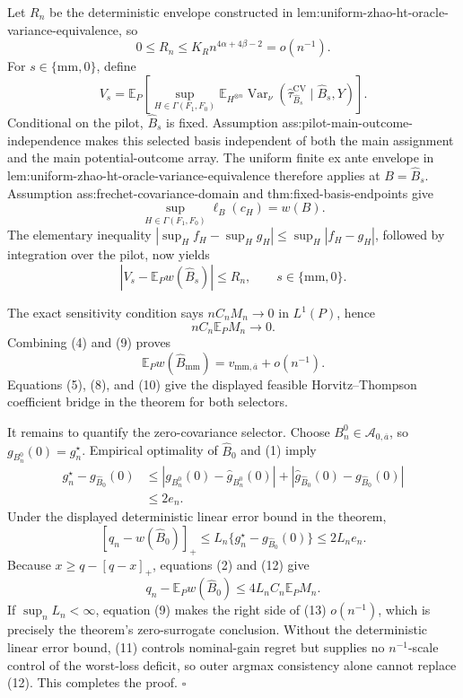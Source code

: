 Let \(R_n\) be the deterministic envelope constructed in lem:uniform-zhao-ht-oracle-variance-equivalence, so
\[
 0\leq R_n\leq K_Rn^{4\alpha+4\beta-2}=o(n^{-1}).
 \tag{5}
\]
For \(s\in\{\mathrm{mm},0\}\), define
\[
 V_s=
 \mathbb E_P\!\left[
 \sup_{H\in\Gamma(F_1,F_0)}
 \mathbb E_{H^{\otimes n}}
 \operatorname{Var}_\nu
 (\widehat\tau_{\widehat B_s}^{\mathrm{CV}}\mid\widehat B_s,Y)
 \right].
 \tag{6}
\]
Conditional on the pilot, \(\widehat B_s\) is fixed.  Assumption ass:pilot-main-outcome-independence makes this selected basis independent of both the main assignment and the main potential-outcome array.  The uniform finite ex ante envelope in lem:uniform-zhao-ht-oracle-variance-equivalence therefore applies at \(B=\widehat B_s\).  Assumption ass:frechet-covariance-domain and thm:fixed-basis-endpoints give
\[
 \sup_{H\in\Gamma(F_1,F_0)}\ell_B(c_H)=w(B).
 \tag{7}
\]
The elementary inequality \(|\sup_Hf_H-\sup_Hg_H|\leq\sup_H|f_H-g_H|\), followed by integration over the pilot, now yields
\[
 |V_s-\mathbb E_Pw(\widehat B_s)|\leq R_n,
 \qquad s\in\{\mathrm{mm},0\}.
 \tag{8}
\]

The exact sensitivity condition says \(nC_nM_n\to0\) in \(L^1(P)\), hence
\[
 nC_n\mathbb E_PM_n\longrightarrow0.
 \tag{9}
\]
Combining (4) and (9) proves
\[
 \mathbb E_Pw(\widehat B_{\mathrm{mm}})
 =v_{\mathrm{mm},\overline a}+o(n^{-1}).
 \tag{10}
\]
Equations (5), (8), and (10) give the displayed feasible Horvitz--Thompson coefficient bridge in the theorem for both selectors.

It remains to quantify the zero-covariance selector.  Choose \(B_n^0\in\mathcal A_{0,\overline a}\), so \(g_{B_n^0}(0)=g_n^\star\).  Empirical optimality of \(\widehat B_0\) and (1) imply
\[
 \begin{aligned}
 g_n^\star-g_{\widehat B_0}(0)
 &\leq
 |g_{B_n^0}(0)-\widehat g_{B_n^0}(0)|
 +|\widehat g_{\widehat B_0}(0)-g_{\widehat B_0}(0)|\\
 &\leq2e_n.
 \end{aligned}
 \tag{11}
\]
Under the displayed deterministic linear error bound in the theorem,
\[
 [q_n-w(\widehat B_0)]_+
 \leq L_n\{g_n^\star-g_{\widehat B_0}(0)\}
 \leq2L_ne_n.
 \tag{12}
\]
Because \(x\geq q-[q-x]_+\), equations (2) and (12) give
\[
 q_n-\mathbb E_Pw(\widehat B_0)
 \leq4L_nC_n\mathbb E_PM_n.
 \tag{13}
\]
If \(\sup_nL_n<\infty\), equation (9) makes the right side of (13) \(o(n^{-1})\), which is precisely the theorem's zero-surrogate conclusion.  Without the deterministic linear error bound, (11) controls nominal-gain regret but supplies no \(n^{-1}\)-scale control of the worst-loss deficit, so outer argmax consistency alone cannot replace (12).  This completes the proof. \(\square\)